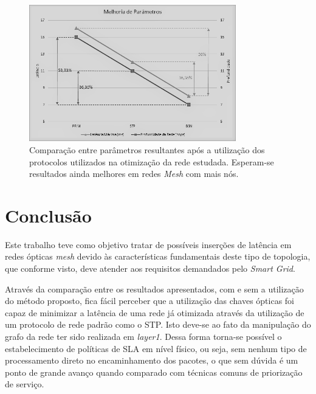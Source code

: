 \documentclass[12pt]{article}
\begin{document}
\begin{figure} %
	\centering
	\includegraphics[width=9cm]{Tabela2GraficoPB}
	\caption{Comparação entre parâmetros resultantes após a utilização dos protocolos utilizados na otimização da rede estudada. Esperam-se resultados ainda melhores em redes \emph{Mesh} com mais nós.}
	\label{fig_tab_percentual}
\end{figure}

\section{Conclusão}

%
Este trabalho teve como objetivo tratar de possíveis inserções de latência em redes ópticas \emph{mesh} devido às características fundamentais deste tipo de topologia, que conforme visto, deve atender aos requisitos demandados pelo \emph{Smart Grid}.

Através da comparação entre os resultados apresentados, com e sem a utilização do método proposto, fica fácil perceber que a utilização das chaves ópticas foi capaz de minimizar a latência de uma rede já otimizada através da utilização de um protocolo de rede padrão como o STP. Isto deve-se ao fato da manipulação do grafo da rede ter sido realizada em \emph{layer1}. Dessa forma torna-se possível o estabelecimento de políticas de SLA em nível físico, ou seja, sem nenhum tipo de processamento direto no encaminhamento dos pacotes, o que sem dúvida é um ponto de grande avanço quando comparado com técnicas comuns de priorização de serviço.
\end{document}

